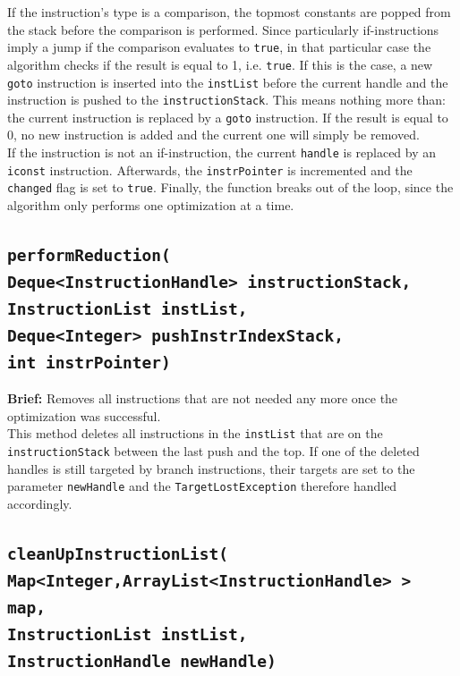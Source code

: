 If the instruction’s type is a comparison, the topmost constants are popped from the stack before the comparison is performed. Since particularly if-instructions imply a jump if the comparison evaluates to \texttt{true}, in that particular case the algorithm checks if the result is equal to 1, i.e. \texttt{true}. If this is the case, a new \texttt{goto} instruction is inserted into the \texttt{instList} before the current handle and the instruction is pushed to the \texttt{instructionStack}. This means nothing more than: the current instruction is replaced by a \texttt{goto} instruction. If the result is equal to 0, no new instruction is added and the current one will simply be removed.\\
If the instruction is not an if-instruction, the current \texttt{handle} is replaced by an \texttt{iconst} instruction. Afterwards, the \texttt{instrPointer} is incremented and the \texttt{changed} flag is set to \texttt{true}. Finally, the function breaks out of the loop, since the algorithm only performs one optimization at a time.

\subsection{\texttt{performReduction(\\
\hspace{2cm}Deque<InstructionHandle> instructionStack, \\
\hspace{2cm}InstructionList instList, \\
\hspace{2cm}Deque<Integer> pushInstrIndexStack, \\
\hspace{2cm}int instrPointer)}}

\textbf{Brief: }Removes all instructions that are not needed any more once the optimization was successful. \\

This method deletes all instructions in the \texttt{instList} that are on the \texttt{instructionStack} between the last push and the top. If one of the deleted handles is still targeted by branch instructions, their targets are set to the parameter \texttt{newHandle} and the \texttt{TargetLostException} therefore handled accordingly.

\subsection{\texttt{cleanUpInstructionList(\\
\hspace{2cm}Map<Integer,ArrayList<InstructionHandle> > map,\\
\hspace{2cm}InstructionList instList,\\
\hspace{2cm}InstructionHandle newHandle)}}

